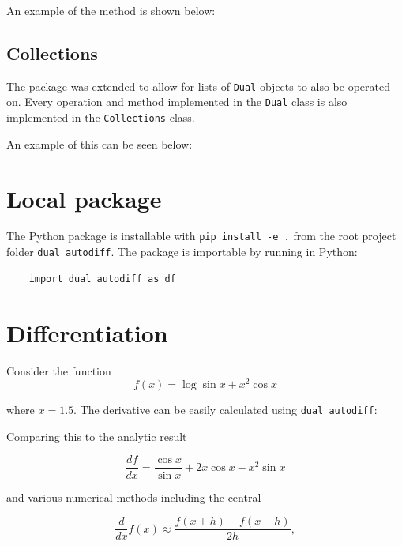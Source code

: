 \documentclass[11pt,a4paper]{article}
\begin{document}
An example of the method is shown below:
\subsection{Collections}
The package was extended to allow for lists of \texttt{Dual} objects to also be operated on. Every operation and method implemented in the \texttt{Dual} class is also implemented in the \texttt{Collections} class. 

An example of this can be seen below:
\begin{landscape}
\end{landscape}

\section{Local package}
The Python package is installable with \texttt{pip install -e .} from the root project folder \texttt{dual\_autodiff}. The package is importable by running in Python:

\begin{lstlisting}
    import dual_autodiff as df
\end{lstlisting}

\section{Differentiation}
Consider the function
\begin{equation}
    f(x) = \log{\sin{x}} + x^2 \cos{x}
    \label{eq:func}
\end{equation}

where $x=1.5$. The derivative can be easily calculated using \texttt{dual\_autodiff}:

Comparing this to the analytic result

\begin{equation}
    \frac{df}{dx} = \frac{\cos{x}}{\sin{x}} + 2 x \cos{x} - x^2 \sin{x} 
\end{equation}

and various numerical methods including the central \citep{numericaldiff}

\begin{equation}
    \frac{d}{dx} f(x) \approx \frac{f(x+h) - f(x-h)}{2h},
\end{equation}
\end{document}
